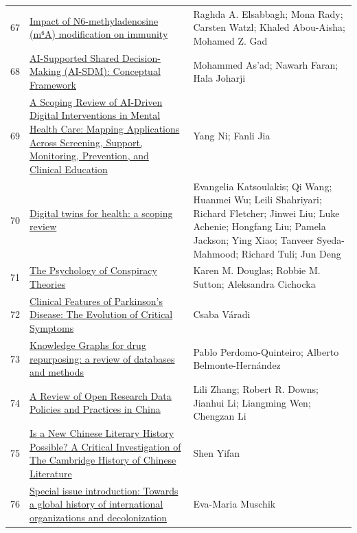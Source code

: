 \documentclass[11pt]{article}
\begin{document}
\begin{longtable}{cp{8cm}p{5cm}}
  67 & \href{https://www.researchgate.net/publication/363416511_Impact_of_N6-methyladenosine_m6A_modification_on_immunity}{Impact of N6-methyladenosine (m⁶A) modification on immunity} & Raghda A. Elsabbagh; Mona Rady; Carsten Watzl; Khaled Abou-Aisha; Mohamed Z. Gad \\
  68 & \href{https://pubmed.ncbi.nlm.nih.gov/40773762/}{AI-Supported Shared Decision-Making (AI-SDM): Conceptual Framework} & Mohammed As'ad; Nawarh Faran; Hala Joharji \\
  69 & \href{https://www.mdpi.com/2227-9032/13/10/1205}{A Scoping Review of AI-Driven Digital Interventions in Mental Health Care: Mapping Applications Across Screening, Support, Monitoring, Prevention, and Clinical Education} & Yang Ni; Fanli Jia \\
  70 & \href{https://pubmed.ncbi.nlm.nih.gov/38519626/}{Digital twins for health: a scoping review} & Evangelia Katsoulakis; Qi Wang; Huanmei Wu; Leili Shahriyari; Richard Fletcher; Jinwei Liu; Luke Achenie; Hongfang Liu; Pamela Jackson; Ying Xiao; Tanveer Syeda-Mahmood; Richard Tuli; Jun Deng \\
  71 & \href{https://www.researchgate.net/publication/317401748_The_Psychology_of_Conspiracy_Theories}{The Psychology of Conspiracy Theories} & Karen M. Douglas; Robbie M. Sutton; Aleksandra Cichocka \\
  72 & \href{https://pubmed.ncbi.nlm.nih.gov/32438686/}{Clinical Features of Parkinson's Disease: The Evolution of Critical Symptoms} & Csaba Váradi \\
  73 & \href{https://doi.org/10.1093/bib/bbae461}{Knowledge Graphs for drug repurposing: a review of databases and methods} & Pablo Perdomo-Quinteiro; Alberto Belmonte-Hernández \\
  74 & \href{https://datascience.codata.org/articles/10.5334/dsj-2021-003}{A Review of Open Research Data Policies and Practices in China} & Lili Zhang; Robert R. Downs; Jianhui Li; Liangming Wen; Chengzan Li \\
  75 & \href{https://www.sciencedirect.com/org/science/article/pii/S2352133324000104}{Is a New Chinese Literary History Possible? A Critical Investigation of The Cambridge History of Chinese Literature} & Shen Yifan \\
  76 & \href{https://www.cambridge.org/core/journals/journal-of-global-history/article/special-issue-introduction-towards-a-global-history-of-international-organizations-and-decolonization/066AFEF8CEA16E7F776CC7CFF72927CC}{Special issue introduction: Towards a global history of international organizations and decolonization} & Eva-Maria Muschik \\

\end{longtable}
\end{document}
